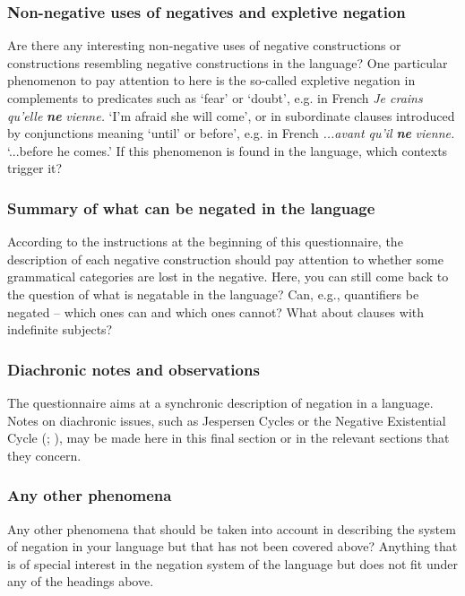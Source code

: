 \documentclass[output=paper,colorlinks,citecolor=brown]{langscibook}
\begin{document}
\subsubsection{Non-negative uses of negatives and expletive negation}\label{sec:quest:4.6.3}
Are there any interesting non-negative uses of negative constructions or constructions resembling negative constructions in the language? One particular phenomenon to pay attention to here is the so-called expletive negation in complements to predicates such as ‘fear’ or ‘doubt’, e.g. in French \textit{Je crains qu’elle} \textbf{\textit{ne}} \textit{vienne.} ‘I’m afraid she will come’, or in subordinate clauses introduced by conjunctions meaning ‘until’ or before’, e.g. in French \textit{...avant qu’il} \textbf{\textit{ne}} \textit{vienne.} ‘...before he comes.’ If this phenomenon is found in the language, which contexts trigger it?

\subsubsection{Summary of what can be negated in the language}\label{sec:quest:4.6.4}

According to the instructions at the beginning of this questionnaire, the description of each negative construction should pay attention to whether some grammatical categories are lost in the negative. Here, you can still come back to the question of what is negatable in the language? Can, e.g., quantifiers be negated – which ones can and which ones cannot? What about clauses with indefinite subjects?

\subsubsection{Diachronic notes and observations}\label{sec:quest:4.6.5}

The questionnaire aims at a synchronic description of negation in a language. Notes on diachronic issues, such as Jespersen Cycles \citep{Auwera2009,Auwera2010} or the Negative Existential Cycle (\citealt{Croft1991}; \citealt{Veselinova2014,Veselinova2016}), may be made here in this final section or in the relevant sections that they concern.

\subsubsection{Any other phenomena}\label{sec:quest:4.6.6}

Any other phenomena that should be taken into account in describing the system of negation in your language but that has not been covered above? Anything that is of special interest in the negation system of the language but does not fit under any of the headings above.
\end{document}
